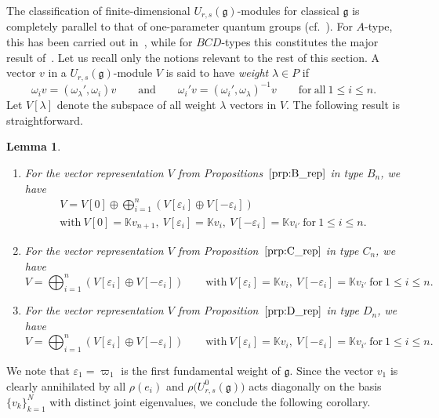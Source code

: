 \documentclass[pdftex]{sigma}
\numberwithin{equation}{section}
\newtheorem{Lemma}[Theorem]{Lemma}
\newcommand{\fg}{\mathfrak{g}}
\begin{document}
The classification of finite-dimensional $U_{r,s}(\fg)$-modules for classical $\fg$ is completely parallel to that of one-parameter quantum groups (cf.\ \cite[Section~5]{J}). For $A$-type, this has been carried out in~\cite{BW2}, while for $BCD$-types this constitutes the major result of~\cite{BGH2}. Let us recall only the notions relevant to the rest of this section.
A vector $v$ in a $U_{r,s}(\mathfrak{g})$-module $V$ is said to have \textit{weight} $\lambda \in P$ if
\begin{displaymath}
 \omega_{i}v = (\omega_{\lambda}',\omega_{i})v \qquad \mathrm{and} \qquad
 \omega_{i}'v = (\omega_{i}',\omega_{\lambda})^{-1}v \qquad \mathrm{for\ all} \ 1\leq i\leq n.
\end{displaymath}
Let $V[\lambda]$ denote the subspace of all weight $\lambda$ vectors in $V$.
The following result is straightforward.


\begin{Lemma}\quad
\begin{enumerate}\itemsep=0pt
\item[$(a)$] For the vector representation $V$ from Propositions~$\ref{prp:B_rep}$ in type $B_n$, we have
\begin{gather*}
 V = V[0] \oplus \bigoplus_{i=1}^{n}(V[\varepsilon_{i}] \oplus V[-\varepsilon_{i}])\\
\mathrm{with} \
 V[0] = \mathbb{K} v_{n+1}, \ V[\varepsilon_{i}] = \mathbb{K}v_{i},\ V[-\varepsilon_{i}] = \mathbb{K}v_{i'}
 \ \text{for} \  1\leq i\leq n.
\end{gather*}

\item[$(b)$] For the vector representation $V$ from Proposition~$\ref{prp:C_rep}$ in type $C_n$, we have
\[
 V = \bigoplus_{i=1}^{n} (V[\varepsilon_{i}] \oplus V[-\varepsilon_{i}])
 \qquad \mathrm{with} \
 V[\varepsilon_{i}] = \mathbb{K}v_{i},\ V[-\varepsilon_{i}] = \mathbb{K}v_{i'} \ \mathrm{for} \ 1\leq i\leq n .
\]

\item[$(c)$] For the vector representation $V$ from Proposition~$\ref{prp:D_rep}$ in type $D_n$, we have
\[
 V = \bigoplus_{i=1}^{n} (V[\varepsilon_{i}] \oplus V[-\varepsilon_{i}])
 \qquad \mathrm{with} \
 V[\varepsilon_{i}] = \mathbb{K}v_{i},\ V[-\varepsilon_{i}] = \mathbb{K}v_{i'} \ \mathrm{for} \ 1\leq i\leq n .
\]
\end{enumerate}
\end{Lemma}


We note that $\varepsilon_1=\varpi_1$ is the first fundamental weight of $\fg$. Since the vector $v_1$ is clearly annihilated by all $\rho(e_i)$ and $\rho\bigl(U^0_{r,s}(\fg)\bigr)$ acts diagonally on the basis $\{v_k\}_{k=1}^N$ with distinct joint eigenvalues, we conclude the following corollary.
\end{document}
